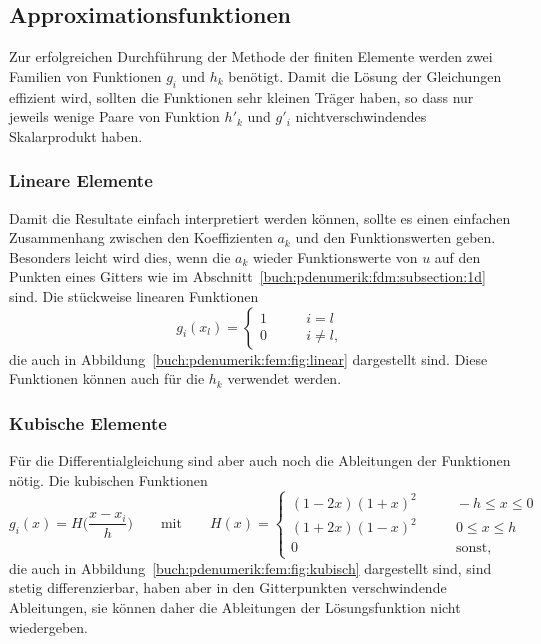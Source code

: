 %
%
\subsection{Approximationsfunktionen}
Zur erfolgreichen Durchführung der Methode der finiten Elemente
werden zwei Familien von Funktionen $g_i$ und $h_k$ benötigt.
Damit die Lösung der Gleichungen effizient wird, sollten die 
Funktionen sehr kleinen Träger haben, so dass nur jeweils wenige
Paare von Funktion $h'_k$ und $g'_i$ nichtverschwindendes Skalarprodukt
haben.

\subsubsection{Lineare Elemente}
Damit die Resultate einfach interpretiert werden können, sollte es
einen einfachen Zusammenhang zwischen den Koeffizienten $a_k$ und
den Funktionswerten geben.
Besonders leicht wird dies, wenn die $a_k$ wieder Funktionswerte
von $u$ auf den Punkten eines Gitters wie im
Abschnitt~\ref{buch:pdenumerik:fdm:subsection:1d} sind.
%
Die stückweise linearen Funktionen
\[
g_i(x_l) = \begin{cases}
1&\qquad i=l \\
0&\qquad i\ne l,
\end{cases}
\]
die auch in Abbildung~\ref{buch:pdenumerik:fem:fig:linear}
dargestellt sind.
Diese Funktionen können auch für die $h_k$ verwendet werden.

\subsubsection{Kubische Elemente}
Für die Differentialgleichung sind aber auch noch die 
Ableitungen der Funktionen nötig.
%
Die kubischen Funktionen 
\[
g_i(x)
=
H\biggl(\frac{x-x_i}{h}\biggr)
\qquad\text{mit} \qquad
H(x)
=
\begin{cases}
(1-2x)(1+x)^2    &\qquad -h\le x \le 0\\
(1+2x)(1-x)^2    &\qquad 0\le x \le h\\
0                &\qquad\text{sonst,}
\end{cases}
\]
die auch in Abbildung~\ref{buch:pdenumerik:fem:fig:kubisch}
dargestellt sind, sind stetig differenzierbar, haben aber
in den Gitterpunkten verschwindende Ableitungen, sie können daher
die Ableitungen der Lösungsfunktion nicht wiedergeben.

